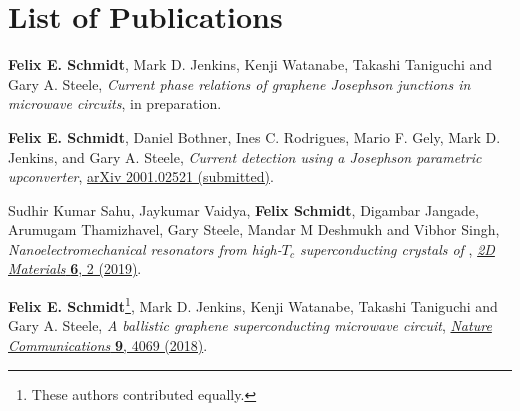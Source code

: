 \chapter*{List of Publications}
\label{publications}

\renewcommand*{\thefootnote}{\fnsymbol{footnote}}
\setcounter{footnote}{0}

\begin{etaremune}{\small


\item \textbf{Felix E. Schmidt}, Mark D. Jenkins, Kenji Watanabe, Takashi Taniguchi and Gary A. Steele, \textit{Current phase relations of graphene Josephson junctions in microwave circuits}, in preparation.

\item \textbf{Felix E. Schmidt}, Daniel Bothner, Ines C. Rodrigues, Mario F. Gely, Mark D. Jenkins, and Gary A. Steele, \textit{Current detection using a Josephson parametric upconverter}, \href{https://arxiv.org/abs/2001.02521}{arXiv 2001.02521 (submitted)}.

\item Sudhir Kumar Sahu, Jaykumar Vaidya, \textbf{Felix Schmidt}, Digambar Jangade, Arumugam Thamizhavel, Gary Steele, Mandar M Deshmukh and Vibhor Singh, \textit{Nanoelectromechanical resonators from high-$T_c$ superconducting crystals of }, \href{https://doi.org/10.1088/2053-1583/ab0800}{\textit{2D Materials} \textbf{6}, 2 (2019)}.

\item \textbf{Felix E. Schmidt}\footnote{\label{foot:equal}These authors contributed equally.}, Mark D. Jenkins, Kenji Watanabe, Takashi Taniguchi and Gary A. Steele, \textit{A ballistic graphene superconducting microwave circuit}, \href{https://doi.org/10.1038/s41467-018-06595-2}{\textit{Nature Communications} \textbf{9}, 4069 (2018)}.

}\end{etaremune}

\renewcommand*{\thefootnote}{\arabic{footnote}}
